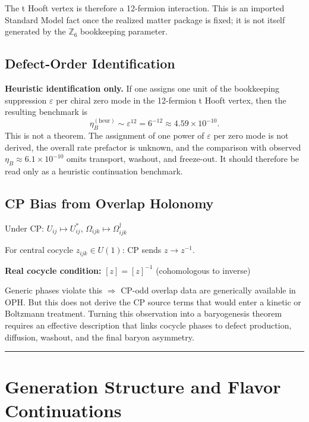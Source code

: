 The \textquotesingle t Hooft vertex is therefore a 12-fermion interaction. This is an imported Standard Model fact once the realized matter package is fixed; it is not itself generated by the \(\mathbb{Z}_6\) bookkeeping parameter.

\subsection{Defect-Order Identification}\label{113-defect-order-identification}

\textbf{Heuristic identification only.} If one assigns one unit of the bookkeeping suppression \(\varepsilon\) per chiral zero mode in the 12-fermion \textquotesingle t Hooft vertex, then the resulting benchmark is
\[
\eta_B^{(\mathrm{heur})} \sim \varepsilon^{12} = 6^{-12} \approx 4.59 \times 10^{-10}.
\]
This is not a theorem. The assignment of one power of \(\varepsilon\) per zero mode is not derived, the overall rate prefactor is unknown, and the comparison with observed \(\eta_B \approx 6.1 \times 10^{-10}\) omits transport, washout, and freeze-out. It should therefore be read only as a heuristic continuation benchmark.

\subsection{CP Bias from Overlap Holonomy}\label{114-cp-bias-from-overlap-holonomy}

Under CP: \(U_{ij} \mapsto U_{ij}^*\), \(\Omega_{ijk} \mapsto \Omega_{ijk}^\dagger\)

For central cocycle \(z_{ijk} \in U(1)\): CP sends \(z \to z^{-1}\).

\textbf{Real cocycle condition:} \([z] = [z]^{-1}\) (cohomologous to inverse)

Generic phases violate this \(\Rightarrow\) CP-odd overlap data are generically available in OPH. But this does not derive the CP source terms that would enter a kinetic or Boltzmann treatment. Turning this observation into a baryogenesis theorem requires an effective description that links cocycle phases to defect production, diffusion, washout, and the final baryon asymmetry.

\begin{center}\rule{0.5\linewidth}{0.5pt}\end{center}

\section{Generation Structure and Flavor Continuations}\label{12-generation-structure-and-yukawa-hierarchy}


